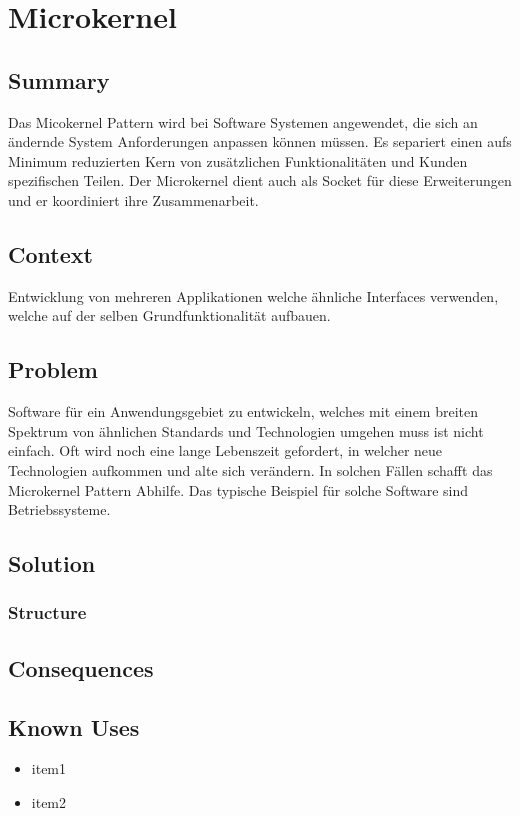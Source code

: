\chapter{Microkernel}

\section{Summary}
Das Micokernel Pattern wird bei Software Systemen angewendet, die sich an ändernde System Anforderungen anpassen können müssen. Es separiert einen aufs Minimum reduzierten Kern von zusätzlichen Funktionalitäten und Kunden spezifischen Teilen. Der Microkernel dient auch als Socket für diese Erweiterungen und er koordiniert ihre Zusammenarbeit.
\section{Context}
Entwicklung von mehreren Applikationen welche ähnliche Interfaces verwenden, welche auf der selben Grundfunktionalität aufbauen.
\section{Problem}
Software für ein Anwendungsgebiet zu entwickeln, welches mit einem breiten Spektrum von ähnlichen Standards und Technologien umgehen muss ist nicht einfach. Oft wird noch eine lange Lebenszeit gefordert, in welcher neue Technologien aufkommen und alte sich verändern. In solchen Fällen schafft das Microkernel Pattern Abhilfe. Das typische Beispiel für solche Software sind Betriebssysteme. 

\section{Solution}

\subsection{Structure}

\section{Consequences}
\begin{itemize}
\end{itemize}

\section{Known Uses}
\begin{itemize}
	\item item1
	\item item2
\end{itemize}

